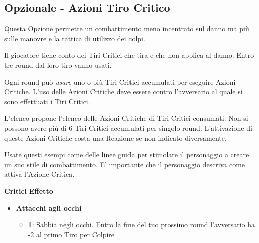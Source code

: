 \begin{multicols}{2}

\subsection{Opzionale - Azioni Tiro Critico}\label{OpzionaleAzioniTiroCritico}\hypertarget{OpzionaleAzioniTiroCritico}{}

Questa Opzione permette un combattimento meno incentrato sul danno ma più sulle manovre e la tattica di utilizzo dei colpi.

Il giocatore tiene conto dei Tiri Critici che tira e che non applica al danno. Entro tre round dal loro tiro vanno usati.

Ogni round può \emph{usare} uno o più Tiri Critici accumulati per eseguire Azioni Critiche. L'uso delle Azioni Critiche deve essere contro l'avversario al quale si sono effettuati i Tiri Critici.

L'elenco propone l'elenco delle Azioni Critiche di Tiri Critici consumati. Non si possono avere più di 6 Tiri Critici accumulati per singolo round.
L'attivazione di queste Azioni Critiche costa una Reazione se non indicato diversamente.

Usate questi esempi come delle linee guida per stimolare il personaggio a creare un suo stile di combattimento. E' importante che il personaggio descriva come attiva l'Azione Critica.

\medskip

\noindent\textbf{Critici} \hskip 0.5cm \textbf{Effetto}

\medskip

\begin{itemize}[leftmargin=*]
	\setlength{\itemsep}{0pt}

	\item \textbf{Attacchi agli occhi}
	\begin{itemize}[leftmargin=*]
		\setlength{\itemsep}{0pt}
		\item \textbf{1}: Sabbia negli occhi. Entro la fine del tuo prossimo round l'avversario ha -2 al primo Tiro per Colpire


\end{itemize}
\end{itemize}
\end{multicols}
